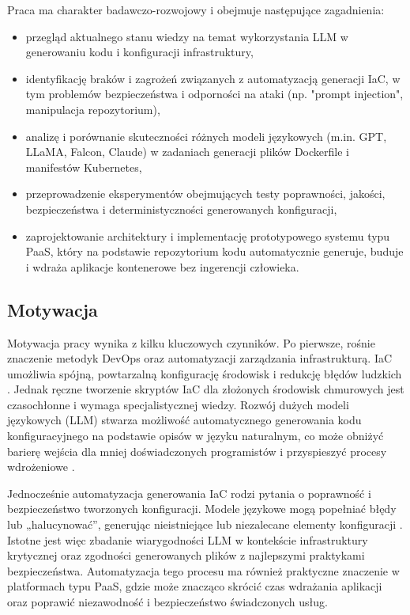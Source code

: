Praca ma charakter badawczo-rozwojowy i obejmuje następujące zagadnienia:
\begin{itemize}
\item przegląd aktualnego stanu wiedzy na temat wykorzystania LLM w generowaniu kodu i konfiguracji infrastruktury,
\item identyfikację braków i zagrożeń związanych z automatyzacją generacji IaC, w tym problemów bezpieczeństwa i odporności na ataki (np. "prompt injection", manipulacja repozytorium),
\item analizę i porównanie skuteczności różnych modeli językowych (m.in. GPT, LLaMA, Falcon, Claude) w zadaniach generacji plików Dockerfile i manifestów Kubernetes,
\item przeprowadzenie eksperymentów obejmujących testy poprawności, jakości, bezpieczeństwa i deterministyczności generowanych konfiguracji,
\item zaprojektowanie architektury i implementację prototypowego systemu typu PaaS, który na podstawie repozytorium kodu automatycznie generuje, buduje i wdraża aplikacje kontenerowe bez ingerencji człowieka.
\end{itemize}

\subsection{Motywacja}

Motywacja pracy wynika z kilku kluczowych czynników. Po pierwsze, rośnie znaczenie metodyk DevOps oraz automatyzacji zarządzania infrastrukturą. IaC umożliwia spójną, powtarzalną konfigurację środowisk i redukcję błędów ludzkich \cite{low_repairing_2024}. Jednak ręczne tworzenie skryptów IaC dla złożonych środowisk chmurowych jest czasochłonne i wymaga specjalistycznej wiedzy. Rozwój dużych modeli językowych (LLM) stwarza możliwość automatycznego generowania kodu konfiguracyjnego na podstawie opisów w języku naturalnym, co może obniżyć barierę wejścia dla mniej doświadczonych programistów i przyspieszyć procesy wdrożeniowe \cite{hu_llm-based_2025}.

Jednocześnie automatyzacja generowania IaC rodzi pytania o poprawność i bezpieczeństwo tworzonych konfiguracji. Modele językowe mogą popełniać błędy lub „halucynować”, generując nieistniejące lub niezalecane elementy konfiguracji \cite{malul_genkubesec_2024}. Istotne jest więc zbadanie wiarygodności LLM w kontekście infrastruktury krytycznej oraz zgodności generowanych plików z najlepszymi praktykami bezpieczeństwa. Automatyzacja tego procesu ma również praktyczne znaczenie w platformach typu PaaS, gdzie może znacząco skrócić czas wdrażania aplikacji oraz poprawić niezawodność i bezpieczeństwo świadczonych usług.

